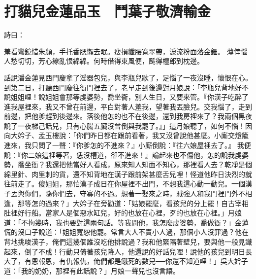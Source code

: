 %

\chapter{打貓兒金蓮品玉　鬥葉子敬濟輸金}

詩曰：

羞看鸞鏡惜朱顏，手托香腮懶去眠。瘦損纖腰寬翠帶，淚流粉面落金鈿。
薄倖惱人愁切切，芳心繚亂恨綿綿。何時借得東風便，颳得檀郎到枕邊。

話說潘金蓮見西門慶拿了淫器包兒，與李瓶兒歇了，足惱了一夜沒睡，懷恨在心。到第二日，打聽西門慶往衙門裡去了，老早走到後邊對月娘說：「李瓶兒背地好不說姐姐哩！說姐姐會那等虔婆勢，喬坐衙，別人生日，又要來管。『你漢子吃醉了進我屋裡來，我又不曾在前邊，平白對著人羞我，望著我丟臉兒。交我惱了，走到前邊，把他爹趕到後邊來。落後他怎的也不在後邊，還到我房裡來了？我兩個黑夜說了一夜梯己話兒，只有心腸五臟沒曾倒與我罷了。』」這月娘聽了，如何不惱！因向大妗子、孟玉樓說：「你們昨日都在跟前看著，我又沒曾說他甚麼。小廝交燈籠進來，我只問了一聲：『你爹怎的不進來？』小廝倒說：『往六娘屋裡去了。』 我便說：『你二娘這裡等著，恁沒槽道，卻不進來！』論起來也不傷他，怎的說我虔婆勢，喬坐衙？我還把他當好人看成，原來知人知面不知心，那裡看人去？乾凈是個綿里針、肉里刺的貨，還不知背地在漢子跟前架甚麼舌兒哩！怪道他昨日決烈的就往前走了。傻姐姐，那怕漢子成日在你屋裡不出門，不想我這心動一動兒。一個漢子丟與你們，隨你們去，守寡的不過。想著一娶來之時，賊強人和我門裡門外不相逢，那等怎的過來？」大妗子在旁勸道：「姑娘罷麼，看孩兒的分上罷！自古宰相肚裡好行船。當家人是個惡水缸兒，好的也放在心裡，歹的也放在心裡。」月娘道：「不拘幾時，我也要對這兩句話。等我問他，我怎麼虔婆勢，喬做衙？」金蓮慌的沒口子說道：「姐姐寬恕他罷。常言大人不責小人過，那個小人沒罪過？他在背地挑唆漢子，俺們這幾個誰沒吃他排說過？我和他緊隔著壁兒，要與他一般見識起來，倒了不成！行動只倚著孩兒降人，他還說的好話兒哩！說他的孩兒到明日長大了，有恩報恩，有仇報仇，俺們都是餓死的數兒──你還不知道哩！」吳大妗子道：「我的奶奶，那裡有此話說？」月娘一聲兒也沒言語。


